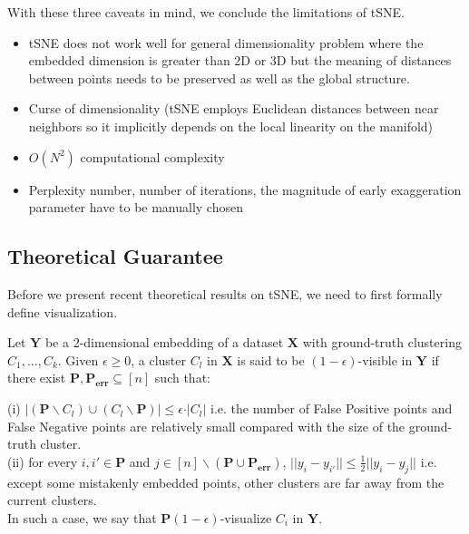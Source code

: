 With these three caveats in mind, we conclude the limitations of tSNE.
\begin{itemize}
  \item tSNE does not work well for general dimensionality problem
    where the embedded dimension is greater than 2D or 3D but the
    meaning of distances between points needs to be preserved as well
    as the global structure. 
  \item Curse of dimensionality (tSNE employs Euclidean distances
    between near neighbors so it implicitly depends on the local
    linearity on the manifold) 
  \item $O(N^2)$ computational complexity
  \item Perplexity number, number of iterations, the magnitude of
    early exaggeration parameter have to be manually chosen 
\end{itemize}

\newpage
\subsection{Theoretical Guarantee}
Before we present recent theoretical results on tSNE, we need to first
formally define visualization. 
\begin{definition}
    Let $\mathbf{Y}$ be a 2-dimensional embedding of a dataset
    $\mathbf{X}$ with ground-truth clustering $C_1,...,C_k$. Given
    $\epsilon \geq 0$, a cluster $C_l$ in $\mathbf{X}$ is said to be
    $(1-\epsilon)$-visible in $\mathbf{Y}$ if there exist $\mathbf{P},
    \mathbf{P_{err}} \subseteq [n]$ such that: 

    \indent (i) $\vert (\mathbf{P}\backslash C_l) \cup (C_l \backslash
    \mathbf{P}) \vert \leq \epsilon \cdot \vert C_l \vert$ i.e. the
    number of False Positive points and False Negative points are
    relatively small compared with the size of the ground-truth
    cluster.\\ 
    \indent (ii) for every $i,i' \in \mathbf{P}$ and $j \in [n]
    \backslash (\mathbf{P} \cup \mathbf{P_{err}})$, $\vert \vert y_i -
    y_{i'} \vert \vert \leq \frac{1}{2} \vert \vert y_i - y_j \vert
    \vert$ i.e. except some mistakenly embedded points, other clusters
    are far away from the current clusters.\\ 
    In such a case, we say that $\mathbf{P}(1-\epsilon)$-visualize
    $C_i$ in $\mathbf{Y}$. 
\end{definition}

